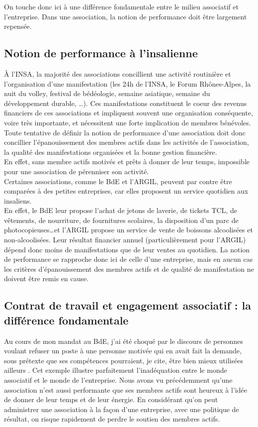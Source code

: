 On touche donc ici à une différence fondamentale entre le milieu associatif et l'entreprise. Dans une association,
la notion de \og performance \fg{} doit être largement repensée.\\

\subsection{Notion de performance \og à l'insalienne \fg}
À l'INSA, la majorité des associations concillient une activité routinière et l'organisation d'une \og manifestation \fg{} (les 24h de l'INSA, le Forum Rhônes-Alpes, la nuit du volley, festival de bédéologie, semaine asiatique, semaine du développement durable, \ldots). Ces manifestations constituent le coeur des revenus financiers de ces associations et impliquent souvent une organisation conséquente, voire très importante, et nécessitent une forte implication de membres bénévoles. Toute tentative de définir la notion de performance d'une association doit donc concillier l'épanouissement des membres actifs dans les activités de l'association, la qualité des manifestations organisées et la bonne gestion financière.\\
En effet, sans membre actifs motivés et prêts à donner de leur temps, impossible pour une association de pérenniser son activité.\\

Certaines associations, comme le BdE et l'ARGIL, peuvent par contre être comparées à des petites entreprises, car elles proposent un service quotidien aux insaliens. \\En effet, le BdE leur propose l'achat de jetons de laverie, de tickets TCL, de vêtements, de nourriture, de fournitures scolaires, la disposition d'un parc de photocopieuses\ldots  et l'ARGIL propose un service de vente de boissons alcoolisées et non-alcoolisées. Leur résultat financier annuel (particulièrement pour l'ARGIL) dépend donc moins de manifestations que de leur ventes au quotidien. La notion de performance se rapproche donc ici de celle d'une entreprise, mais en aucun cas les critères d'épanouissement des membres actifs et de qualité de manifestation ne doivent être remis en cause.

\subsection{Contrat de travail et engagement associatif : la différence fondamentale}
Au cours de mon mandat au BdE, j'ai été choqué par le discours de personnes voulant refuser un poste à une personne motivée qui en avait fait la demande, sous prétexte que ses compétences pourraient, je cite, \og être bien mieux utilisées ailleurs \fg{}. Cet exemple illustre parfaitement l'inadéquation entre le monde associatif et le monde de l'entreprise. Nous avons vu précédemment qu'une association n'est aussi \og performante\fg{} que ses membres actifs sont heureux à l'idée de donner de leur temps et de leur énergie. En considérant qu'on peut administrer une association à la façon d'une entreprise, avec une politique de résultat, on risque rapidement de perdre le soutien des membres actifs.\\

